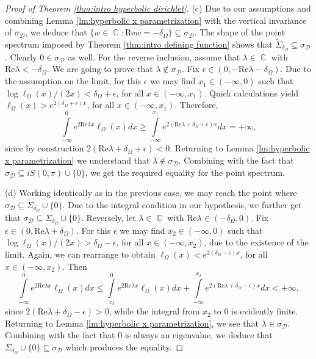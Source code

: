 \documentclass[11pt]{amsart}
\numberwithin{equation}{section}
\theoremstyle{definition}
\DeclareMathOperator{\C}{\mathbb{C}}
\begin{document}
\begin{proof}[Proof of Theorem \ref{thm:intro hyperbolic dirichlet}]
		(c) Due to our assumptions and combining Lemma \ref{lm:hyperbolic x parametrization} with the vertical invariance of $\sigma_\mathcal{D}$, we deduce that $\{w\in\C:\mathrm{Re}w=-\delta_\Omega\}\subseteq\sigma_{\mathcal{D}}$. The shape of the point spectrum imposed by Theorem \ref{thm:intro defining function} shows that $\widetilde{\Sigma}_{\delta_\Omega}\subseteq\sigma_{\mathcal{D}}$. Clearly $0\in\sigma_{\mathcal{D}}$ as well. For the reverse inclusion, assume that $\lambda\in\C$ with $\mathrm{Re}\lambda<-\delta_\Omega$. We are going to prove that $\lambda\notin\sigma_{\mathcal{D}}$. Fix $\epsilon\in(0,-\mathrm{Re}\lambda-\delta_\Omega)$. Due to the assumption on the limit, for this $\epsilon$ we may find $x_1\in(-\infty,0)$ such that $\log\ell_\Omega(x)/(2x)<\delta_\Omega+\epsilon$, for all $x\in(-\infty,x_1)$. Quick calculations yield $\ell_\Omega(x)>e^{2(\delta_\Omega+\epsilon)x}$, for all $x\in(-\infty,x_1)$. Therefore,
		\begin{equation*}
			\int\limits_{-\infty}^{0}e^{2\mathrm{Re}\lambda x}\ell_\Omega(x)dx\ge\int\limits_{-\infty}^{x_1}e^{2(\mathrm{Re}\lambda+\delta_\Omega+\epsilon)x}dx=+\infty,
		\end{equation*}
		since by construction $2(\mathrm{Re}\lambda+\delta_\Omega+\epsilon)<0$. Returning to Lemma \ref{lm:hyperbolic x parametrization} we understand that $\lambda\notin\sigma_{\mathcal{D}}$. Combining with the fact that $\sigma_{\mathcal{D}}\subseteq iS(0,\pi)\cup\{0\}$, we get the required equality for the point spectrum.
		
		(d) Working identically as in the previous case, we may reach the point where $\sigma_{\mathcal{D}}\subseteq \widetilde{\Sigma}_{\delta_\Omega}\cup\{0\}$. Due to the integral condition in our hypothesis, we further get that $\sigma_{\mathcal{D}}\subseteq \Sigma_{\delta_\Omega}\cup\{0\}$. Reversely, let $\lambda\in\C$ with $\mathrm{Re}\lambda\in(-\delta_\Omega,0)$. Fix $\epsilon\in(0,\mathrm{Re}\lambda+\delta_\Omega)$. For this $\epsilon$ we may find $x_2\in(-\infty,0)$ such that $\log\ell_\Omega(x)/(2x)>\delta_\Omega-\epsilon$, for all $x\in(-\infty,x_2)$, due to the existence of the limit. Again, we can rearrange to obtain $\ell_\Omega(x)<e^{2(\delta_\Omega-\epsilon)x}$, for all $x\in(-\infty,x_2)$. Then
		\begin{equation*}
			\int\limits_{-\infty}^{0}e^{2\mathrm{Re}\lambda x}\ell_\Omega(x)dx\le\int\limits_{x_2}^{0}e^{2\mathrm{Re}\lambda x}\ell_\Omega(x)dx+\int\limits_{-\infty}^{x_2}e^{2(\mathrm{Re}\lambda+\delta_\Omega-\epsilon)x}dx<+\infty,
		\end{equation*}
		since $2(\mathrm{Re}\lambda+\delta_\Omega-\epsilon)>0$, while the integral from $x_2$ to $0$ is evidently finite. Returning to Lemma \ref{lm:hyperbolic x parametrization}, we see that $\lambda\in\sigma_{\mathcal{D}}$. Combining with the fact that $0$ is always an eigenvalue, we deduce that $\Sigma_{\delta_\Omega}\cup\{0\}\subseteq\sigma_{\mathcal{D}}$ which produces the equality.
		

\end{proof}
\end{document}
